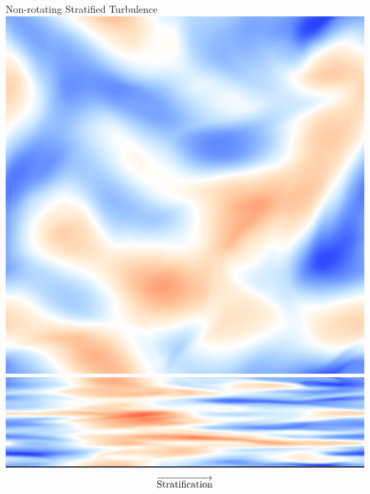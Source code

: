 \documentclass[aspecttatio=169]{beamer}
\begin{document}
\begin{frame}{Non-rotating Stratified Turbulence}
        \includegraphics[width=.99\textwidth]{images/XYB300ux.png}
        \includegraphics[width=.99\textwidth]{images/XZB300ux.png}
    \emp
    \[\overrightarrow{\rm Stratification}\]
\end{frame}
\end{document}
